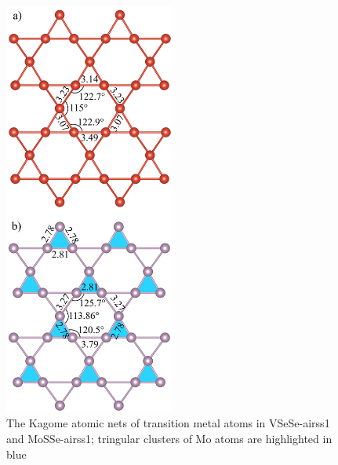 \documentclass[a4paperm]{article}
\begin{document}
\begin{figure}
	\includegraphics [width=0.5\textwidth]{airss1_tm.png}
	\caption{The Kagome atomic nets of transition metal atoms in VSeSe-airss1 and MoSSe-airss1; tringular clusters of Mo atoms are highlighted in blue} 
\label{airss1_tm}
\end{figure}
\end{document}
